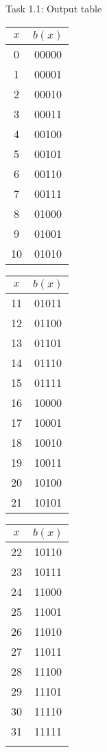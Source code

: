 \documentclass[aspectratio=169]{beamer}
\begin{document}
\begin{frame}{Task 1.1: Output table}
    \begin{tabular}{c|c}
        $x$ & $b(x)$ \\\hline
        0 & 00000 \\
        1 & 00001 \\
        2 & 00010 \\
        3 & 00011 \\
        4 & 00100 \\
        5 & 00101 \\
        6 & 00110 \\
        7 & 00111 \\
        8 & 01000 \\
        9 & 01001 \\
       10 & 01010 \\
    \end{tabular}\hfill
    \begin{tabular}{c|c}
       $x$ & $b(x)$ \\\hline
       11 & 01011 \\
       12 & 01100 \\
       13 & 01101 \\
       14 & 01110 \\
       15 & 01111 \\
       16 & 10000 \\
       17 & 10001 \\
       18 & 10010 \\
       19 & 10011 \\
       20 & 10100 \\
       21 & 10101 \\
    \end{tabular}\hfill
    \begin{tabular}{c|c}
       $x$ & $b(x)$ \\\hline
       22 & 10110 \\
       23 & 10111 \\
       24 & 11000 \\
       25 & 11001 \\
       26 & 11010 \\
       27 & 11011 \\
       28 & 11100 \\
       29 & 11101 \\
       30 & 11110 \\
       31 & 11111 \\
       \\
    \end{tabular}
\end{frame}
\end{document}
